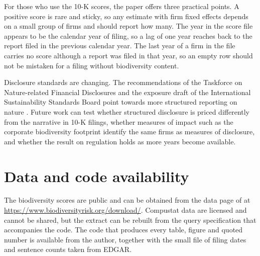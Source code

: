 \documentclass[12pt,a4paper]{article}
\begin{document}
For those who use the 10-K scores, the paper offers three practical points. A positive score is rare and sticky, so any estimate with firm fixed effects depends on a small group of firms and should report how many. The year in the score file appears to be the calendar year of filing, so a lag of one year reaches back to the report filed in the previous calendar year. The last year of a firm in the file carries no score although a report was filed in that year, so an empty row should not be mistaken for a filing without biodiversity content.

Disclosure standards are changing. The recommendations of the Taskforce on Nature-related Financial Disclosures and the exposure draft of the International Sustainability Standards Board point towards more structured reporting on nature \citep{tnfd2023,issb2026}. Future work can test whether structured disclosure is priced differently from the narrative in 10-K filings, whether measures of impact such as the corporate biodiversity footprint identify the same firms as measures of disclosure, and whether the result on regulation holds as more years become available.

\section*{Data and code availability}

The biodiversity scores are public and can be obtained from the data page of \citet{giglio2026} at \url{https://www.biodiversityrisk.org/download/}. Compustat data are licensed and cannot be shared, but the extract can be rebuilt from the query specification that accompanies the code. The code that produces every table, figure and quoted number is available from the author, together with the small file of filing dates and sentence counts taken from EDGAR.
\end{document}
